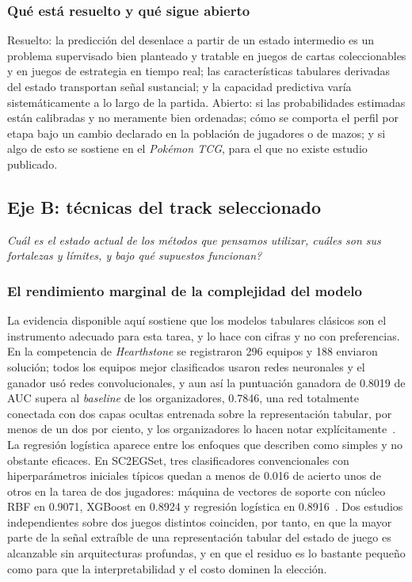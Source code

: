 \documentclass[conference]{IEEEtran}
\begin{document}
\subsubsection{Qu\'e est\'a resuelto y qu\'e sigue abierto}
Resuelto: la predicci\'on del desenlace a partir de un estado intermedio es
un problema supervisado bien planteado y tratable en juegos de cartas
coleccionables y en juegos de estrategia en tiempo real; las
caracter\'isticas tabulares derivadas del estado transportan se\~nal
sustancial; y la capacidad predictiva var\'ia sistem\'aticamente a lo largo
de la partida. Abierto: si las probabilidades estimadas est\'an calibradas y
no meramente bien ordenadas; c\'omo se comporta el perfil por etapa bajo un
cambio declarado en la poblaci\'on de jugadores o de mazos; y si algo de
esto se sostiene en el \emph{Pok\'emon TCG}, para el que no existe estudio
publicado.

\subsection{Eje B: t\'ecnicas del track seleccionado}
\label{subsec:axisb}
\emph{\textquestiondown Cu\'al es el estado actual de los m\'etodos que pensamos
utilizar, cu\'ales son sus fortalezas y l\'imites, y bajo qu\'e supuestos
funcionan?}

\subsubsection{El rendimiento marginal de la complejidad del modelo}
La evidencia disponible aqu\'i sostiene que los modelos tabulares
cl\'asicos son el instrumento adecuado para esta tarea, y lo hace con
cifras y no con preferencias. En la competencia de \emph{Hearthstone} se
registraron 296 equipos y 188 enviaron soluci\'on; todos los equipos mejor
clasificados usaron redes neuronales y el ganador us\'o redes
convolucionales, y aun as\'i la puntuaci\'on ganadora de 0.8019 de AUC
supera al \emph{baseline} de los organizadores, 0.7846, una red
totalmente conectada con dos capas ocultas entrenada sobre la
representaci\'on tabular, por menos de un dos por ciento, y los
organizadores lo hacen notar expl\'icitamente~\cite{janusz_hearthstone_2017}.
La regresi\'on log\'istica aparece entre los enfoques que describen como
simples y no obstante eficaces. En SC2EGSet, tres clasificadores
convencionales con hiperpar\'ametros iniciales t\'ipicos quedan a menos de
0.016 de acierto unos de otros en la tarea de dos jugadores: m\'aquina de
vectores de soporte con n\'ucleo RBF en 0.9071, XGBoost en 0.8924 y
regresi\'on log\'istica en 0.8916~\cite{bialecki_sc2egset_2023}. Dos
estudios independientes sobre dos juegos distintos coinciden, por tanto, en
que la mayor parte de la se\~nal extra\'ible de una representaci\'on
tabular del estado de juego es alcanzable sin arquitecturas profundas, y en
que el residuo es lo bastante peque\~no como para que la interpretabilidad
y el costo dominen la elecci\'on.
\end{document}
